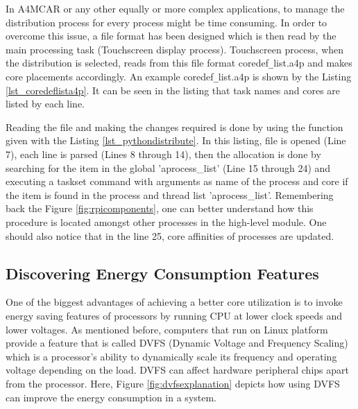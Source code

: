 In A4MCAR or any other equally or more complex applications, to manage the distribution process for every process might be time consuming. In order to overcome this issue, a file format has been designed which is then read by the main processing task (Touchscreen display process). Touchscreen process, when the distribution is selected, reads from this file format coredef\texttt{\_}list.a4p and makes core placements accordingly. An example coredef\texttt{\_}list.a4p is shown by the Listing \ref{lst_coredeflista4p}. It can be seen in the listing that task names and cores are listed by each line.


Reading the file and making the changes required is done by using the function given with the Listing \ref{lst_pythondistribute}. In this listing, file is opened (Line 7), each line is parsed (Lines 8 through 14), then the allocation is done by searching for the item in the global 'aprocess{\_}list' (Line 15 through 24) and executing a taskset command with arguments as name of the process and core if the item is found in the process and thread list 'aprocess{\_}list'. Remembering back the Figure \ref{fig:rpicomponents}, one can better understand how this procedure is located amongst other processes in the high-level module. One should also notice that in the line 25, core affinities of processes are updated.


\subsection{Discovering Energy Consumption Features}
One of the biggest advantages of achieving a better core utilization is to invoke energy saving features of processors by running CPU at lower clock speeds and lower voltages. As mentioned before, computers that run on Linux platform provide a feature that is called DVFS (Dynamic Voltage and Frequency Scaling) \cite{dvfsieee} which is a processor's ability to dynamically scale its frequency and operating voltage depending on the load. DVFS can affect hardware peripheral chips apart from the processor. Here, Figure \ref{fig:dvfsexplanation} \cite{dvfspaper} depicts how using DVFS can improve the energy consumption in a system.

